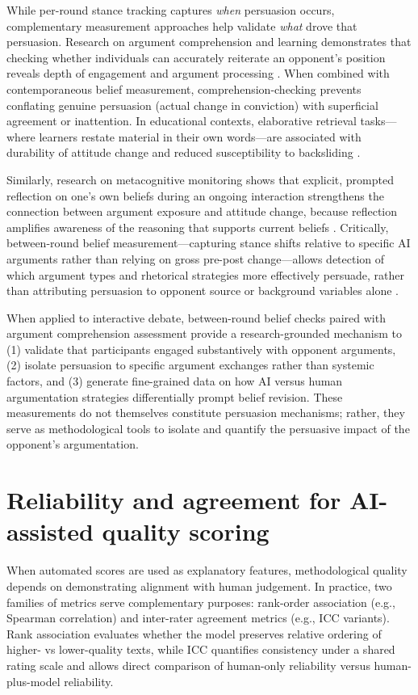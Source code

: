 While per-round stance tracking captures \textit{when} persuasion occurs, complementary measurement
approaches help validate \textit{what} drove that persuasion. Research on argument comprehension
and learning demonstrates that checking whether individuals can accurately reiterate an opponent's
position reveals depth of engagement and argument processing
\cite{sternberg2013_cognitive_psychology_book}. When combined with contemporaneous belief measurement,
comprehension-checking prevents conflating genuine persuasion (actual change in conviction) with
superficial agreement or inattention. In educational contexts, elaborative retrieval tasks—where
learners restate material in their own words—are associated with durability of attitude change
and reduced susceptibility to backsliding \cite{craik_lockhart_1972_levels_of_processing}.

Similarly, research on metacognitive monitoring shows that explicit, prompted reflection on one's
own beliefs during an ongoing interaction strengthens the connection between argument exposure and
attitude change, because reflection amplifies awareness of the reasoning that supports current beliefs
\cite{schommer1990_effects_reflection_critical_thinking}.
Critically, between-round belief measurement—capturing stance shifts relative to specific AI arguments
rather than relying on gross pre-post change—allows detection of which argument types and rhetorical
strategies more effectively persuade, rather than attributing persuasion to opponent source or
background variables alone \cite{durmus2024_measuring_persuasiveness}.

When applied to interactive debate, between-round belief checks paired with argument comprehension
assessment provide a research-grounded mechanism to (1) validate that participants engaged
substantively with opponent arguments, (2) isolate persuasion to specific argument exchanges rather
than systemic factors, and (3) generate fine-grained data on how AI versus human argumentation
strategies differentially prompt belief revision. These measurements do not themselves constitute
persuasion mechanisms; rather, they serve as methodological tools to isolate and quantify the
persuasive impact of the opponent's argumentation.

\section{Reliability and agreement for AI-assisted quality scoring}

When automated scores are used as explanatory features, methodological quality
depends on demonstrating alignment with human judgement. In practice, two
families of metrics serve complementary purposes: rank-order association
(e.g., Spearman correlation) and inter-rater agreement metrics
(e.g., ICC variants). Rank association evaluates whether the model preserves
relative ordering of higher- vs lower-quality texts, while ICC quantifies
consistency under a shared rating scale and allows direct comparison of
human-only reliability versus human-plus-model reliability.

